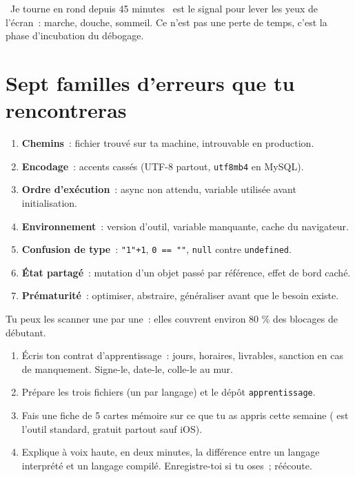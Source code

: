 \begin{note}
\og ~Je tourne en rond depuis 45 minutes~ \fg{} est le signal pour lever les yeux de l'\'ecran~: marche,
douche, sommeil. Ce n'est pas une perte de temps, c'est la phase d'incubation du d\'ebogage.
\end{note}

\section{Sept familles d'erreurs que tu rencontreras}

\begin{enumerate}
  \item \textbf{Chemins}~: fichier trouv\'e sur ta machine, introuvable en production.
  \item \textbf{Encodage}~: accents cass\'es (UTF-8 partout, \verb|utf8mb4| en MySQL).
  \item \textbf{Ordre d'ex\'ecution}~: async non attendu, variable utilis\'ee avant initialisation.
  \item \textbf{Environnement}~: version d'outil, variable manquante, cache du navigateur.
  \item \textbf{Confusion de type}~: \verb|"1"+1|, \verb|0 == ""|, \verb|null| contre \verb|undefined|.
  \item \textbf{\'Etat partag\'e}~: mutation d'un objet pass\'e par r\'ef\'erence, effet de bord cach\'e.
  \item \textbf{Pr\'ematurit\'e}~: optimiser, abstraire, g\'en\'eraliser avant que le besoin existe.
\end{enumerate}

Tu peux les scanner une par une~: elles couvrent environ 80 \% des blocages de d\'ebutant.

\begin{exercice}
\begin{enumerate}
  \item \'Ecris ton contrat d'apprentissage~: jours, horaires, livrables, sanction en cas de
        manquement. Signe-le, date-le, colle-le au mur.
  \item Pr\'epare les trois fichiers  (un par langage) et le d\'ep\^ot
        \verb|apprentissage|.
  \item Fais une fiche de 5 cartes m\'emoire sur ce que tu as appris cette semaine
        ( est l'outil standard, gratuit partout sauf iOS).
  \item Explique \`a voix haute, en deux minutes, la diff\'erence entre un langage interpr\'et\'e
        et un langage compil\'e. Enregistre-toi si tu oses~; r\'e\'ecoute.
\end{enumerate}
\end{exercice}

